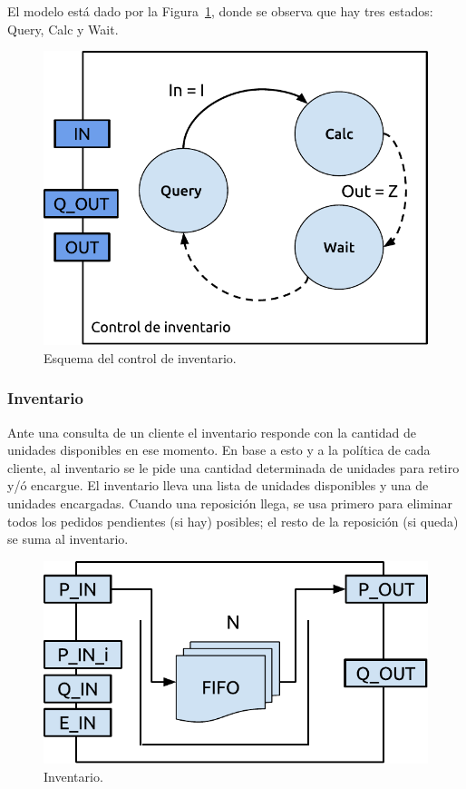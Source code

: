 \documentclass[10pt]{article}
\begin{document}
El modelo está dado por la Figura~\ref{fig:fig6}, donde se observa que hay tres estados: Query, Calc y Wait.

\begin{figure}
\centering
\includegraphics[scale=1]{img/figura6}
\caption{Esquema del control de inventario.}
\label{fig:fig6}
\end{figure}


\subsubsection{Inventario}

Ante una consulta de un cliente el inventario responde con la cantidad de unidades disponibles en ese momento. En base a esto y a la política de cada cliente, al inventario se le pide una cantidad determinada de unidades para retiro y/ó encargue.
El inventario lleva una lista de unidades disponibles y una de unidades encargadas. Cuando una reposición llega, se usa primero para eliminar todos los pedidos pendientes (si hay) posibles; el resto de la reposición (si queda) se suma al inventario. 

\begin{figure}
\centering
\includegraphics[scale=1]{img/figura7}
\caption{Inventario.}
\label{fig:fig7}
\end{figure}
\end{document}
